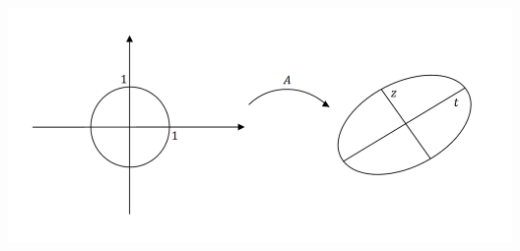 \begin{enumerate}
\begin{center}
        \includegraphics[scale=0.6]{l7_4.png}
    \end{center}
\end{enumerate}